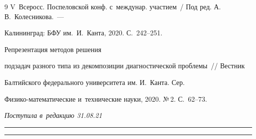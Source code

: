 {{\begin{thebibliography}{9}
V~Всеросс. Поспеловской конф. с~междунар. участием~/ Под ред. А.\,В.~Колесникова.~--- 

Калининград: БФУ им.\ И.~Канта, 2020. С.~242--251.


  Репрезентация методов решения 

подзадач разного типа из декомпозиции диагностической проб\-ле\-мы~/\!\!/ Вестник 

Балтийского федерального университета им. И.~Канта. Сер.  

Фи\-зи\-ко-ма\-те\-ма\-ти\-че\-ские и~технические науки, 2020. №\,2. С.~62--73.

       \end{thebibliography}

} }







\vspace*{-3pt}



\hfill{\small\textit{Поступила в~редакцию 31.08.21}}



\vspace*{8pt}



\hrule



\vspace*{2pt}









\hrule






\def\tit{RESEARCH PROTOTYPE OF~A~COGNITIVE HYBRID 

INTELLIGENT SYSTEM FOR~SUPPORTING DIAGNOSTIC 

DECISION-MAKING}





\def\titkol{Research prototype of~a~cognitive hybrid 

intelligent system for supporting %

decision-making}



